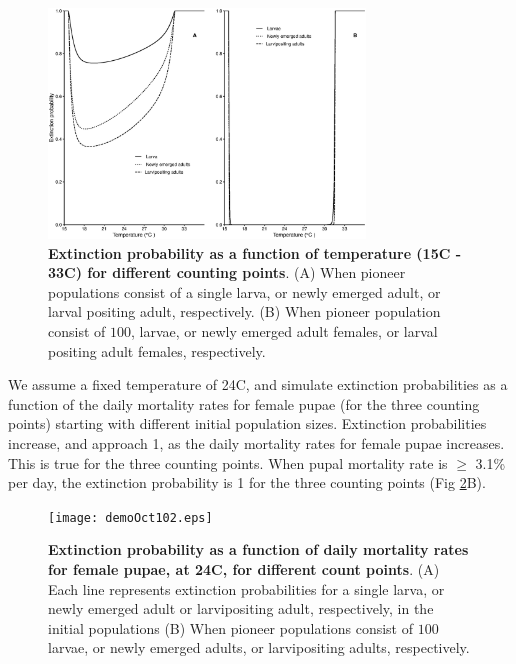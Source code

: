 \documentclass[smallextended]{svjour3}
\begin{document}
\begin{figure}[h]
	\includegraphics[width=0.75\textwidth]{Nov26-1.eps}
	\caption{{\bf Extinction probability as a function of temperature (15\degree C - 33\degree C) for different counting points}. (A) When pioneer populations consist of  a single larva, or newly emerged adult, or larval positing adult, respectively. (B) When pioneer population consist of  $100$, larvae, or newly emerged adult females, or larval positing adult females, respectively.}
	\label{fig:2}       %
\end{figure}
%
\newpage

 We assume a fixed temperature of 24\degree C, and simulate extinction probabilities  as a function of the daily mortality rates for female pupae (for the three counting points) starting with different initial population sizes. Extinction probabilities increase, and approach 1, as the daily mortality rates for female pupae increases. This is true for the three counting points. When pupal mortality rate is $\geq$ 3.1\% per day, the extinction probability is 1 for the three counting points (Fig \ref{fig:3}B).   



\begin{figure}[h]
	\texttt{[image: demoOct102.eps]}
		\caption{{\bf Extinction probability as a function of daily mortality rates for female pupae, at 24\degree C, for different count points}. (A) Each line represents extinction probabilities for a single larva, or newly emerged adult or larvipositing adult, respectively, in the initial populations (B) When pioneer populations consist of  $100$ larvae,  or newly emerged adults, or larvipositing adults, respectively.}
	\label{fig:3}       %
\end{figure}
%
\end{document}
